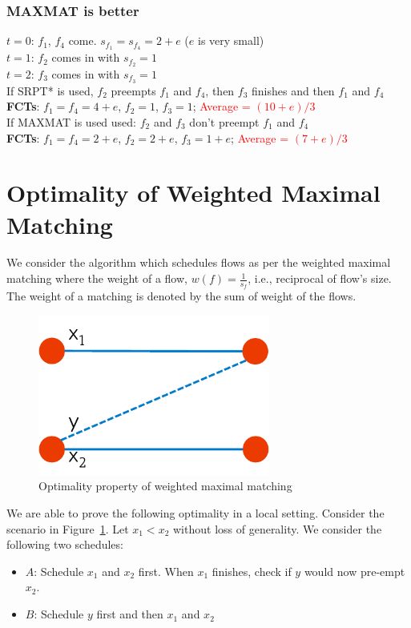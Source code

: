 \documentclass[12pt]{article}
\begin{document}
\subsubsection{MAXMAT is better}
  $t = 0$: $f_1$, $f_4$ come. $s_{f_1} = s_{f_4} = 2 + e$   ($e$ is very small) \\
  $t = 1$: $f_2$ comes in with $s_{f_2} = 1$  \\
  $t = 2$: $f_3$ comes in with $s_{f_3} = 1$  \\
If SRPT* is used, $f_2$ preempts $f_1$ and $f_4$, then $f_3$ finishes and then $f_1$ and $f_4$ \\
\textbf{FCTs}: $f_1 = f_4 = 4+e$, $f_2 = 1$, $f_3 = 1$; \textcolor{red}{Average = $(10+e)/3$}\\
If MAXMAT is used used: $f_2$ and $f_3$ don’t preempt $f_1$ and $f_4$ \\
\textbf{FCTs}: $f_1 = f_4 = 2+e$, $f_2 = 2+e$, $f_3 = 1+e$; \textcolor{red}{Average = $(7+e)/3$}


\section{Optimality of Weighted Maximal Matching}
We consider the algorithm which schedules flows as per the weighted maximal matching where the weight of a flow, $w(f) = \frac{1}{s_f}$, i.e., reciprocal of flow's size. The weight of a matching is denoted by the sum of weight of the flows.

\begin{figure}[ht!]
   \centering
   \includegraphics[width=3in]{Figures/wmaxmat.pdf}
   \caption{Optimality property of weighted maximal matching}
   \label{fig:fig2}
 \end{figure}


We are able to prove the following optimality in a local setting. Consider the scenario in Figure~\ref{fig:fig2}. Let $x_1 < x_2$ without loss of generality. We consider the following two schedules:
\begin{itemize}
	\item {\bf $A$}: Schedule $x_1$ and $x_2$ first. When $x_1$ finishes, check if $y$ would now pre-empt $x_2$. 
	\item {\bf $B$}: Schedule $y$ first and then $x_1$ and $x_2$
\end{itemize}
\end{document}
